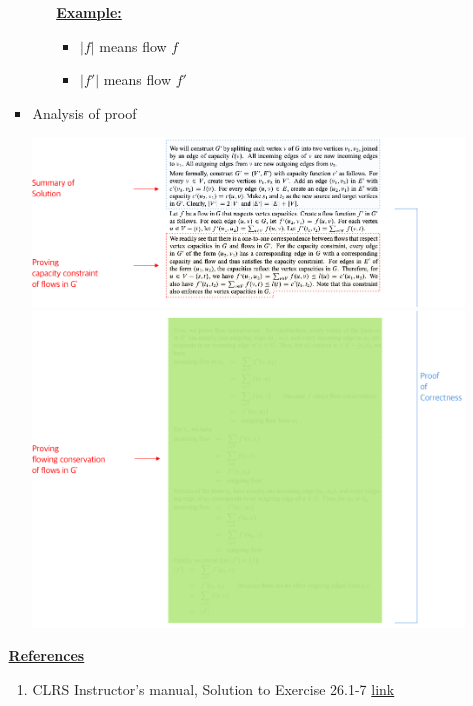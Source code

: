 \documentclass[12pt]{article}
\begin{document}
\begin{enumerate}[1.]
\begin{enumerate}[a)]
\begin{itemize}
\begin{itemize}
                \bigskip

                \underline{\textbf{Example:}}

                \bigskip

                \begin{itemize}
                    \item $\lvert f \rvert$ means flow $f$
                    \item $\lvert f' \rvert$ means flow $f'$
                \end{itemize}
            \end{itemize}
            \item Analysis of proof

            \begin{center}
            \includegraphics[width=\linewidth]{images/worksheet_5_solution_27.png}
            \includegraphics[width=\linewidth]{images/worksheet_5_solution_28.png}
            \end{center}
        \end{itemize}


        \bigskip

        \underline{\textbf{References}}

        \bigskip

        \begin{enumerate}[1)]
            \item CLRS Instructor's manual, Solution to Exercise 26.1-7 \href{https://cdn.manesht.ir/19908___Introduction%20to%20Algorithms.pdf}{link}
        \end{enumerate}
    \end{enumerate}


\end{enumerate}
\end{document}
